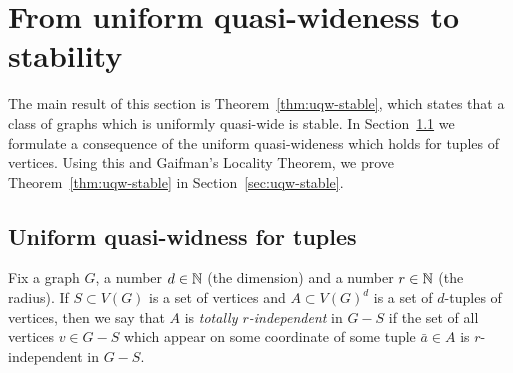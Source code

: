 
\section{From uniform quasi-wideness to stability}\label{sec:stable}
The main result of this section is Theorem~\ref{thm:uqw-stable},
which states 
that a class of graphs which is uniformly quasi-wide is stable.
In Section~\ref{sec:uqw-tuples} we formulate a consequence of the uniform quasi-wideness which
holds for tuples of vertices. Using this and  Gaifman's Locality Theorem, we prove Theorem~\ref{thm:uqw-stable} in Section~\ref{sec:uqw-stable}.


\subsection{Uniform quasi-widness for tuples}\label{sec:uqw-tuples}
Fix a graph $G$, a number $d\in\mathbb{N}$ (the dimension) and a number $r\in \mathbb{N}$ (the radius).
If $S\subset V(G)$ is a set of vertices and $A\subset V(G)^d$ is a set of $d$-tuples of vertices,
then we say that $A$ is \emph{totally $r$-independent} in $G-S$ 
if the set of all vertices $v\in G-S$ which appear on some coordinate of some tuple $\bar a\in A$
is $r$-independent in $G-S$. 


